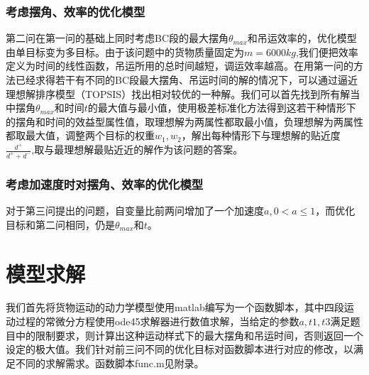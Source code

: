 \documentclass[withoutpreface,bwprint]{cumcmthesis} %
\begin{document}
\subsubsection{考虑摆角、效率的优化模型}

第二问在第一问的基础上同时考虑BC段的最大摆角$\theta_{max}$和吊运效率的，优化模型由单目标变为多目标。由于该问题中的货物质量固定为$m=6000kg$,我们便把效率定义为时间的线性函数，吊运所用的总时间越短，调运效率越高。在用第一问的方法已经求得若干有不同的BC段最大摆角、吊运时间的解的情况下，可以通过逼近理想解排序模型（TOPSIS）找出相对较优的一种解。我们可以首先找到所有解当中摆角$\theta_{max}$和时间$t$的最大值与最小值，使用极差标准化方法得到这若干种情形下的摆角和时间的效益型属性值，取理想解为两属性都取最小值，负理想解为两属性都取最大值，调整两个目标的权重$w_1,w_2$，解出每种情形下与理想解的贴近度$\frac{d^+}{d^++d^-}$,取与最理想解最贴近近的解作为该问题的答案。

\subsubsection{考虑加速度时对摆角、效率的优化模型}
对于第三问提出的问题，自变量比前两问增加了一个加速度$a, 0<a\leq1$，而优化目标和第二问相同，仍是$\theta_{max}$和$t$。

\section{模型求解}
我们首先将货物运动的动力学模型使用matlab编写为一个函数脚本，其中四段运动过程的常微分方程使用ode45求解器进行数值求解，当给定的参数$a,t1,t3$满足题目中的限制要求，则计算出这种运动样式下的最大摆角和吊运时间，否则返回一个设定的极大值。我们针对前三问不同的优化目标对函数脚本进行对应的修改，以满足不同的求解需求。函数脚本func.m见附录。
\end{document}
